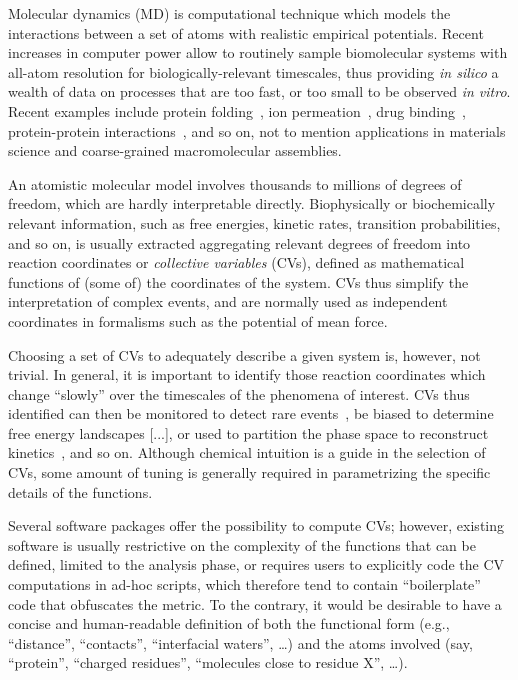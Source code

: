 \documentclass[preprint,12pt]{elsarticle}
\begin{document}
Molecular dynamics (MD) is computational technique which models the
interactions between a set of atoms with realistic empirical
potentials. Recent increases in computer power allow to routinely
sample biomolecular systems with all-atom resolution for
biologically-relevant timescales, thus providing \emph{in silico} a
wealth of data on processes that are too fast, or too small to be
observed \emph{in vitro}. Recent examples include protein
folding~\cite{Lindorff-Larsen_Piana_Dror_Shaw_2011}, ion
permeation~\cite{Jensen_Jogini_Borhani_Leffler_Dror_Shaw_2012}, drug
binding~\cite{Shan_Kim_Eastwood_Dror_Seeliger_Shaw_2011,Buch_Giorgino_2011},
protein-protein
interactions~\cite{Ahmad_Gu_Helms_2008,Giorgino_Buch_2012}, and so on,
not to mention applications in materials science and coarse-grained
macromolecular assemblies.

An atomistic molecular model involves thousands to millions of degrees
of freedom, which are hardly interpretable directly. Biophysically or
biochemically relevant information, such as free energies, kinetic
rates, transition probabilities, and so on,  is usually extracted
aggregating relevant degrees of freedom into reaction coordinates or
\emph{collective variables} (CVs), defined as mathematical functions of (some
of) the coordinates of the system.  CVs thus  simplify the
interpretation of complex events, and are normally used as independent
coordinates in formalisms such as the potential of mean force.

Choosing a set of CVs to adequately describe a given system is,
however, not trivial. In general, it is important to identify those
reaction coordinates which change ``slowly'' over the timescales of
the phenomena of interest. CVs thus identified can then be monitored
to detect rare events~\cite{Giorgino_Buch_2012}, be biased to
determine free energy landscapes [...], or used to partition the phase
space to reconstruct
kinetics~\cite{Biarnes_Pietrucci_Marinelli_Laio_2012,Noe_Fischer_2008},
and so on.  Although chemical intuition is a guide in the selection of
CVs, some amount of tuning is generally required in parametrizing the
specific details of the functions.

Several software packages offer the possibility to compute CVs;
however, existing software is usually restrictive on the complexity of
the functions that can be defined, limited to the analysis phase, or
requires users to explicitly code the CV computations in ad-hoc
scripts, which therefore tend to contain ``boilerplate'' code that
obfuscates the metric. To the contrary, it would be desirable to have
a concise and human-readable definition of both the functional form
(e.g., ``distance'', ``contacts'', ``interfacial waters'', \dots) and
 the atoms involved (say, ``protein'', ``charged residues'',
``molecules close to residue X'', \dots).
\end{document}
